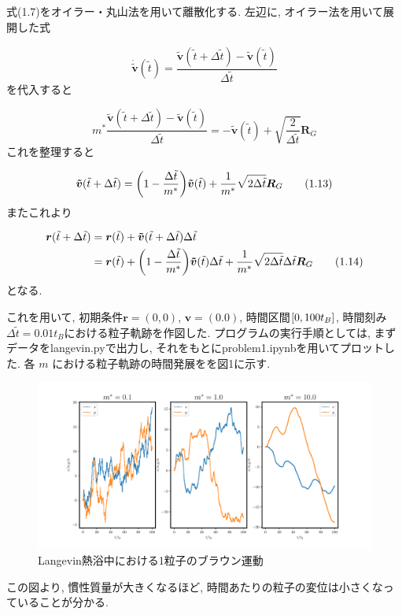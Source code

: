\documentclass[a4paper,dvipdfmx]{jarticle}
\begin{document}
\newpage


\subsection{}
\noindent
式(1.7)をオイラー・丸山法を用いて離散化する.
左辺に, オイラー法を用いて展開した式

\begin{equation}
    \bm{\dot{\tilde{v}}}(\tilde{t}) 
    = \frac{\bm{\tilde{v}}(\tilde{t}+\Delta \tilde{t})-\bm{\tilde{v}}(\tilde{t})}{\Delta \tilde{t}}
    \tag{1.11}
\end{equation}
を代入すると

\begin{equation}
    m^* \frac{\bm{\tilde{v}}(\tilde{t}+\Delta \tilde{t})-\bm{\tilde{v}}(\tilde{t})}{\Delta \tilde{t}}
    = -\bm{\tilde{v}}(\tilde{t}) + \sqrt{\frac{2}{\Delta \tilde{t}}}\bm{R}_G \tag{1.12}
\end{equation}
これを整理すると

\begin{equation}    
    \bm{\tilde{v}}(\tilde{t}+\Delta \tilde{t}) = \qty(1-\frac{\Delta \tilde{t}}{m^*})\bm{\tilde{v}}(\tilde{t})
    + \frac{1}{m^*}\sqrt{2\Delta \tilde{t}}\bm{R}_G  \tag{1.13}
\end{equation}
またこれより

\begin{align*}
    \bm{r}(\tilde{t}+\Delta \tilde{t}) &= \bm{r}(\tilde{t}) + \bm{\tilde{v}}(\tilde{t}+\Delta \tilde{t})\Delta \tilde{t} \\
    &= \bm{r}(\tilde{t}) + \qty(1-\frac{\Delta \tilde{t}}{m^*})\bm{\tilde{v}}(\tilde{t})\Delta \tilde{t}
    + \frac{1}{m^*}\sqrt{2\Delta \tilde{t}}\Delta \tilde{t}\bm{R}_G \tag{1.14}
\end{align*}
となる.

\noindent
これを用いて, 初期条件$\bm{r}=(0,0)$, $\bm{v}=(0.0)$, 時間区間$\qty[0, 100t_B]$, 時間刻み$\Delta \tilde{t}=0.01t_B$における粒子軌跡を作図した.
プログラムの実行手順としては, まずデータをlangevin.pyで出力し, それをもとにproblem1.ipynbを用いてプロットした.
各 $m$ における粒子軌跡の時間発展をを図1に示す.

\begin{figure}[H]
    \centering
    \includegraphics[scale=0.4]{problem_1/1-4/problem1-4.pdf}
    \caption{Langevin熱浴中における1粒子のブラウン運動}
\end{figure}
この図より, 慣性質量が大きくなるほど, 時間あたりの粒子の変位は小さくなっていることが分かる.
\end{document}
